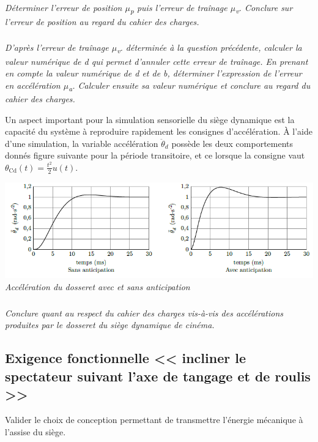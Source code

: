 \documentclass[10pt,fleqn]{article} %
\begin{document}
\begin{multicols}{2}
\subparagraph{\label{q13}}\textit{Déterminer l'erreur de position $\mu$\emph{\textsubscript{p}} puis
  l'erreur de traînage $\mu$\emph{\textsubscript{v}}. Conclure sur l'erreur
  de position au regard du cahier des charges.}
  
\subparagraph{\label{q14}}\textit{D'après l'erreur de traînage $\mu$\emph{\textsubscript{v}}. déterminée à
  la question précédente, calculer la valeur numérique de d qui permet
  d'annuler cette erreur de traînage. En prenant en compte la valeur
  numérique de d et de b, déterminer l'expression de l'erreur en
  accélération $\mu$\emph{\textsubscript{a}}. Calculer ensuite sa valeur
  numérique et conclure au regard du cahier des charges.}

Un aspect important pour la simulation sensorielle du siège dynamique
est la capacité du système à reproduire rapidement les consignes
d'accélération. À l'aide d'une simulation, la variable accélération
\({\ddot{\theta}}_{d}\) possède les deux comportements donnés figure suivante
pour la période transitoire, et ce lorsque la consigne vaut
\(\theta_{\text{Cd}}\left( t \right) = \frac{t^{2}}{2}u(t)\).


\begin{center}
\includegraphics[width=1.0\linewidth]{images/image18.png}
\textit{Accélération du dosseret avec et sans anticipation \label{fig17}}
\end{center}

\subparagraph{}\textit{Conclure quant au respect du cahier des charges vis-à-vis des
  accélérations produites par le dosseret du siège dynamique de cinéma.}


\subsection{Exigence fonctionnelle << incliner le spectateur suivant l'axe de tangage et de roulis >>}

\begin{obj}
Valider le choix de conception permettant de transmettre l'énergie mécanique à l'assise du siège.
\end{obj}


\end{multicols}
\end{document}
